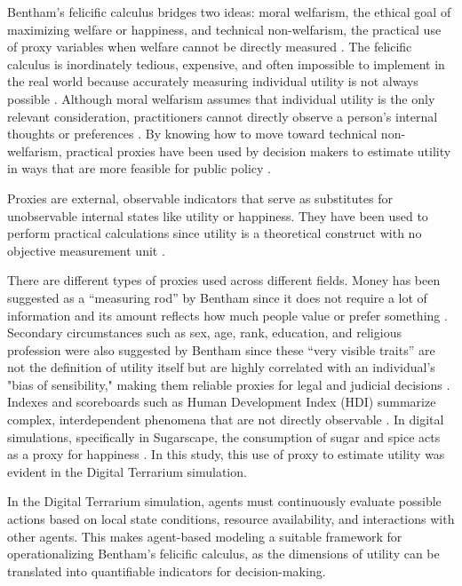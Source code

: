 \documentclass{icsthesis}
\begin{document}
\begin{mainmatter}
Bentham's felicific calculus bridges two ideas: moral welfarism, the ethical goal of maximizing welfare or happiness, and technical non-welfarism, the practical use of proxy variables when welfare cannot be directly measured \citep{Baujard2006}. The felicific calculus is inordinately tedious, expensive, and often impossible to implement in the real world because accurately measuring individual utility is not always possible \citep{Baujard2006}. Although moral welfarism assumes that individual utility is the only relevant consideration, practitioners cannot directly observe a person's internal thoughts or preferences \citep{Baujard2006}. By knowing how to move toward technical non-welfarism, practical proxies have been used by decision makers to estimate utility in ways that are more feasible for public policy \citep{Baujard2006}. 

Proxies are external, observable indicators that serve as substitutes for unobservable internal states like utility or happiness. They have been used  to perform practical calculations since utility is a theoretical construct with no objective measurement unit \citep{Li2002}.

There are different types of proxies used across different fields. Money has been suggested as a “measuring rod” by Bentham since it does not require a lot of information and its amount reflects how much people value or prefer something \citep{Baujard2006}. Secondary circumstances such as sex, age, rank, education, and religious profession were also suggested by Bentham since these “very visible traits” are not the definition of utility itself but are highly correlated with an individual's "bias of sensibility," making them reliable proxies for legal and judicial decisions \citep{Baujard2009}. Indexes and scoreboards such as Human Development Index (HDI) summarize complex, interdependent phenomena that are not directly observable \citep{Munda2020}. In digital simulations, specifically in Sugarscape, the consumption of sugar and spice acts as a proxy for happiness  \citep{KremerHerman2024}. In this study, this use of proxy to estimate utility was evident in the Digital Terrarium simulation. 

In the Digital Terrarium simulation, agents must continuously evaluate possible actions based on local state conditions, resource availability, and interactions with other agents. This makes agent-based modeling a suitable framework for operationalizing Bentham's felicific calculus, as the dimensions of utility can be translated into quantifiable indicators for decision-making.


\end{mainmatter}
\end{document}
